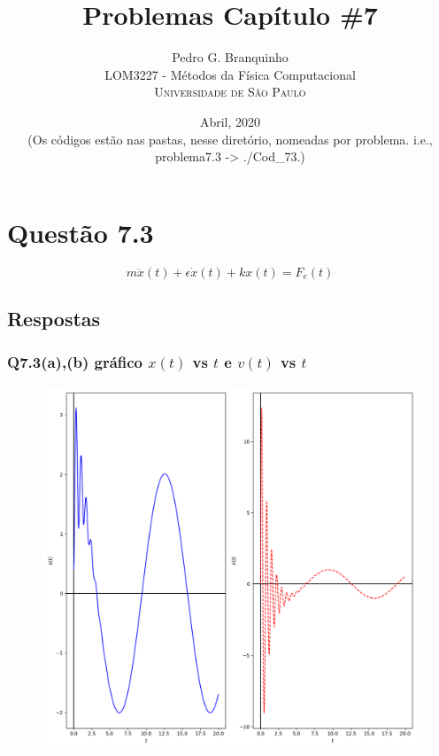 \documentclass[12pt]{article}
\title{Problemas Capítulo \#7}
\author{Pedro G. Branquinho\\ %
  LOM3227 - Métodos da Física Computacional \\ %
  \textsc{Universidade de São Paulo}
}
\date{Abril, 2020 \\ (Os códigos estão nas pastas, nesse diretório, nomeadas por
problema. i.e., problema7.3 -> ./Cod\_73.)} %
\begin{document}
\setlength{\droptitle}{-5em}
\maketitle


\clearpage
\section*{Questão 7.3}
{\bfseries
  \begin{equation}
    m \ddot x(t) + \epsilon \dot x(t) + k x(t) = F_e (t)
  \end{equation}
}

\subsection*{Respostas}

\subsubsection*{Q7.3(a),(b) gráfico $x(t)$ vs $t$ e $v(t)$ vs $t$}

\begin{figure}[!hbt]
  \begin{center}
    \includegraphics[scale=0.6]{./Cod_73/x(t)_v(t)}
  \end{center}
\end{figure}
\end{document}
